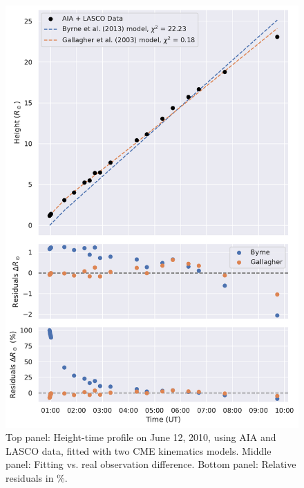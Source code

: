 \begin{figure}[!htp]
	\centering
	\includegraphics[width=0.8\hsize]{chapter2/figs/appendix/height_profile_residuals_aia_lasco_100612_01.pdf}
	\caption{Top panel: Height-time profile on June 12, 2010, using AIA and LASCO data, fitted with two CME kinematics models. Middle panel: Fitting vs. real observation difference. Bottom panel: Relative residuals in \%.}
\end{figure}

